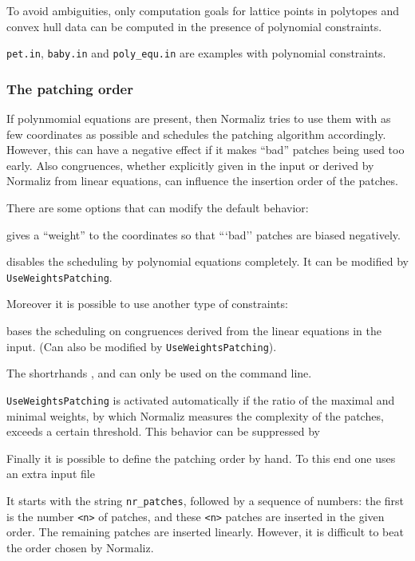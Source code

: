 To avoid ambiguities, only computation goals for lattice points in polytopes and convex hull data can be computed in the presence of polynomial constraints. 

\verb|pet.in|, \verb|baby.in| and \verb*|poly_equ.in| are examples with polynomial constraints.

\subsubsection{The patching order}\label{patch_order}

If polynmomial equations are present, then Normaliz tries to use them with as few coordinates as possible and schedules the patching algorithm accordingly. However, this can have a negative effect if it makes ``bad'' patches being used too early. Also congruences, whether explicitly given in the input or derived by Normaliz from linear equations, can influence the insertion order of the patches. 

There are some options that can modify the default behavior:
\begin{itemize}
	 gives a ``weight'' to the coordinates so that ```bad'' patches are biased negatively.
	
	 disables the scheduling by polynomial equations completely. It can be modified by \verb|UseWeightsPatching|.
\end{itemize}
Moreover it is possible to use another type of constraints:
\begin{itemize}
	 bases the scheduling on congruences derived from the linear equations in the input. (Can also be modified by \verb|UseWeightsPatching|).
\end{itemize}
The shortrhands ,  and  can only be used on the command line.

	
\verb*|UseWeightsPatching| is activated automatically if the ratio of the maximal and minimal weights, by which Normaliz measures the complexity of the patches, exceeds a certain threshold. This behavior can be suppressed by
\begin{itemize}
	\itemtt[NoWeights]
\end{itemize}

Finally it is possible to define the patching order by hand. To this end one uses an extra input file
\begin{itemize}
\end{itemize}
It starts with the string \verb*|nr_patches|, followed by a sequence of numbers: the first is the number \verb|<n>| of patches, and these  \verb|<n>| patches are inserted in the given order. The remaining patches are inserted linearly. However, it is difficult to beat the order chosen by Normaliz.


